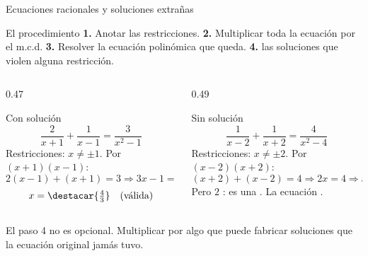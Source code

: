 \documentclass[aspectratio=169,10pt]{beamer}
\begin{document}
\begin{frame}{Ecuaciones racionales y soluciones extrañas}
  \scriptsize
  \begin{block}{El procedimiento}
    \tiny
    \textbf{1.} Anotar las restricciones. \quad
    \textbf{2.} Multiplicar toda la ecuación por el m.c.d. \quad
    \textbf{3.} Resolver la ecuación polinómica que queda. \quad
    \textbf{4.}  las soluciones que violen alguna
    restricción.
  \end{block}

  \vspace{0.1cm}
  \begin{columns}[T,onlytextwidth]
    \begin{column}{0.47\textwidth}
      \begin{exampleblock}{Con solución}
        \tiny
        \[ \frac{2}{x+1}+\frac{1}{x-1}=\frac{3}{x^{2}-1} \]
        Restricciones: $x\neq\pm1$. Por $(x+1)(x-1)$:
        \[ 2(x-1)+(x+1)=3 \Rightarrow 3x-1=3 \]
        \[ x=\destacar{\tfrac{4}{3}} \quad \text{(válida)} \]
      \end{exampleblock}
    \end{column}
    \begin{column}{0.49\textwidth}
      \begin{alertblock}{Sin solución}
        \tiny
        \[ \frac{1}{x-2}+\frac{1}{x+2}=\frac{4}{x^{2}-4} \]
        Restricciones: $x\neq\pm2$. Por $(x-2)(x+2)$:
        \[ (x+2)+(x-2)=4 \Rightarrow 2x=4 \Rightarrow x=2 \]
        Pero $2$ : es una .
        La ecuación .
      \end{alertblock}
    \end{column}
  \end{columns}

  \vspace{0.05cm}
  {\tiny\color{uniGris} El paso 4 no es opcional. Multiplicar por algo que
   puede fabricar soluciones que la ecuación original
  jamás tuvo.}
\end{frame}
\end{document}
